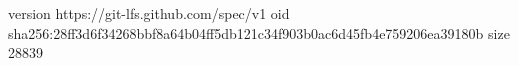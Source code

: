 version https://git-lfs.github.com/spec/v1
oid sha256:28ff3d6f34268bbf8a64b04ff5db121c34f903b0ac6d45fb4e759206ea39180b
size 28839
